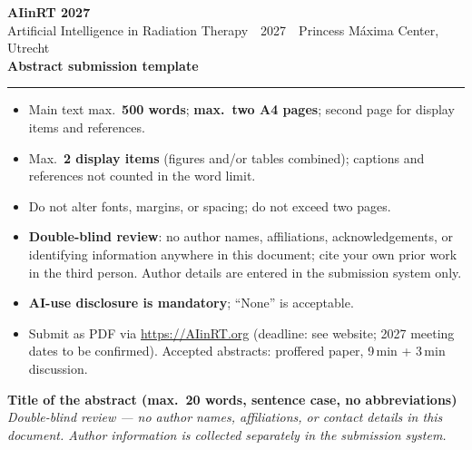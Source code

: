 \documentclass[10pt,a4paper]{article}
\begin{document}
\begin{center}
  {\LARGE\bfseries\color{aiNavy} AIinRT 2027}\\[2pt]
  {\small\color{aiGrey} Artificial Intelligence in Radiation Therapy
   \,\textperiodcentered\, 2027
   \,\textperiodcentered\, Princess M\'axima Center, Utrecht}\\[2pt]
  {\color{aiAccent}\bfseries Abstract submission template}\\[2pt]
  \textcolor{aiAccent}{\rule{\textwidth}{0.8pt}}
\end{center}

\begin{tcolorbox}[colback=aiNavy!6,colframe=aiAccent,title=Instructions
  (delete this box before submission),fonttitle=\bfseries\small,fontupper=\small]
\begin{itemize}\setlength\itemsep{1pt}
  \item Main text max.\ \textbf{500 words}; \textbf{max.\ two A4 pages}; second page for
        display items and references.
  \item Max.\ \textbf{2 display items} (figures and/or tables combined);
        captions and references not counted in the word limit.
  \item Do not alter fonts, margins, or spacing; do not exceed two pages.
  \item \textbf{Double-blind review}: no author names, affiliations,
        acknowledgements, or identifying information anywhere in this
        document; cite your own prior work in the third person. Author
        details are entered in the submission system only.
  \item \textbf{AI-use disclosure is mandatory}; ``None'' is acceptable.
  \item Submit as PDF via \url{https://AIinRT.org} (deadline: see website;
        2027 meeting dates to be confirmed). Accepted abstracts: proffered
        paper, 9\,min + 3\,min discussion.
\end{itemize}
\end{tcolorbox}

{\large\bfseries Title of the abstract (max.\ 20 words, sentence case, no
abbreviations)}\\[4pt]
{\small\itshape\color{aiGrey} Double-blind review --- no author names,
affiliations, or contact details in this document. Author information is
collected separately in the submission system.}
\end{document}
